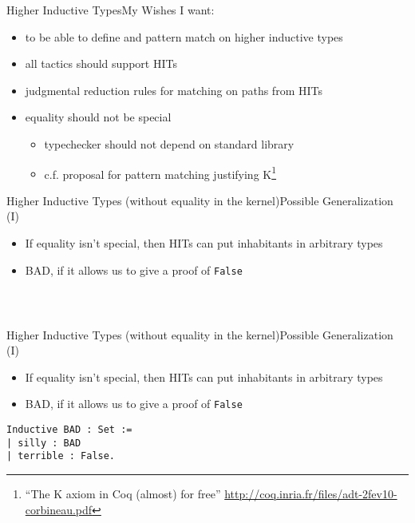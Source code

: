 \documentclass{beamer}
\begin{document}
\begin{frame}{Higher Inductive Types}{My Wishes}
  \Large
  I want: \pause
  \begin{itemize}
	\item to be able to define and pattern match on higher inductive types \pause
	\item all tactics should support HITs \pause
	\item judgmental reduction rules for matching on paths from HITs \pause
	\item equality should not be special \pause
	  \begin{itemize} \large
	    \item typechecker should not depend on standard library \pause
	    \item c.f. proposal for pattern matching justifying K\footnote<7->{``The K axiom in Coq (almost) for free'' \url{http://coq.inria.fr/files/adt-2fev10-corbineau.pdf}}
	  \end{itemize}
  \end{itemize}
\end{frame}

\begin{frame}[fragile]{Higher Inductive Types (without equality in the kernel)}{Possible Generalization (I)}
  \Large
  \begin{itemize}
    \item If equality isn't special, then HITs can put inhabitants in arbitrary types \pause
    \item BAD, if it allows us to give a proof of \texttt{False}
  \end{itemize}
\begin{verbatim}



\end{verbatim}
\end{frame}

\begin{frame}[fragile]{Higher Inductive Types (without equality in the kernel)}{Possible Generalization (I)}
  \Large
  \begin{itemize}
    \item If equality isn't special, then HITs can put inhabitants in arbitrary types
    \item BAD, if it allows us to give a proof of \texttt{False}
  \end{itemize}
\begin{verbatim}
Inductive BAD : Set :=
| silly : BAD
| terrible : False.
\end{verbatim}
\end{frame}
\end{document}
